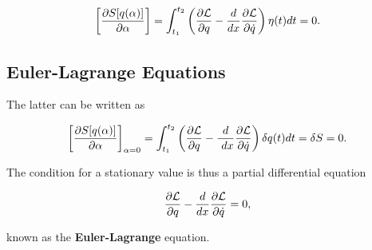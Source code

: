 \documentclass[%
oneside,                 %
final,                   %
10pt]{article}
\begin{document}
\[
\left[\frac{\partial  S[q(\alpha)]}{\partial \alpha}\right]=\int_{t_1}^{t_2} \left( \frac{\partial {\cal L}}{\partial q}-\frac{d}{dx}\frac{\partial {\cal L}}{\partial \dot{q}}
\right)\eta(t)dt=0.
\]

\subsection*{Euler-Lagrange Equations}

The latter can be written as

\[
\left[\frac{\partial  S[q(\alpha)]}{\partial \alpha}\right]_{\alpha=0}=\int_{t_1}^{t_2} \left( \frac{\partial {\cal L}}{\partial q}-\frac{d}{\
dx}\frac{\partial {\cal L}}{\partial \dot{q}}\right)\delta q(t)dt=\delta S = 0.
\]

The condition for a stationary value is thus a partial differential equation

\[
\frac{\partial {\cal L}}{\partial q}-\frac{d}{dx}\frac{\partial {\cal L}}{\partial \dot{q}}=0,
\]

known as the \textbf{Euler-Lagrange} equation.


\end{document}
